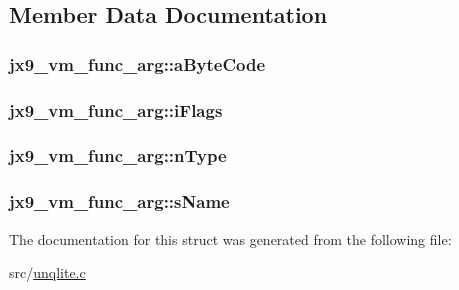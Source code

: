 \subsection{Member Data Documentation}
\hypertarget{structjx9__vm__func__arg_abb3212d6a14c83adecf21863dabecc7b}{
\subsubsection[{a\-Byte\-Code}]{ jx9\-\_\-vm\-\_\-func\-\_\-arg\-::a\-Byte\-Code}}\label{d4/d14/structjx9__vm__func__arg_abb3212d6a14c83adecf21863dabecc7b}
\hypertarget{structjx9__vm__func__arg_ae268e9c5e80a0f7cf5a4b1c0b56a6e69}{
\subsubsection[{i\-Flags}]{ jx9\-\_\-vm\-\_\-func\-\_\-arg\-::i\-Flags}}\label{d4/d14/structjx9__vm__func__arg_ae268e9c5e80a0f7cf5a4b1c0b56a6e69}
\hypertarget{structjx9__vm__func__arg_a026dd986500bac6fb6f106a744f614fb}{
\subsubsection[{n\-Type}]{ jx9\-\_\-vm\-\_\-func\-\_\-arg\-::n\-Type}}\label{d4/d14/structjx9__vm__func__arg_a026dd986500bac6fb6f106a744f614fb}
\hypertarget{structjx9__vm__func__arg_a948e8c6ddc84a6371c775d8f781b9ff5}{
\subsubsection[{s\-Name}]{ jx9\-\_\-vm\-\_\-func\-\_\-arg\-::s\-Name}}\label{d4/d14/structjx9__vm__func__arg_a948e8c6ddc84a6371c775d8f781b9ff5}


The documentation for this struct was generated from the following file\-:\begin{DoxyCompactItemize}
\item 
src/\hyperlink{unqlite_8c}{unqlite.\-c}\end{DoxyCompactItemize}

